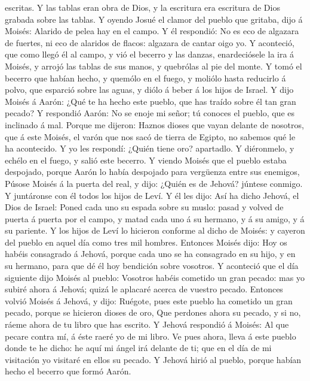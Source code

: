 escritas.  Y las tablas eran obra de Dios, y la escritura
era escritura de Dios grabada sobre las tablas.  Y oyendo
Josué el clamor del pueblo que gritaba, dijo á Moisés: Alarido de pelea
hay en el campo.  Y él respondió: No es eco de algazara
de fuertes, ni eco de alaridos de flacos: algazara de cantar oigo yo.
 Y aconteció, que como llegó él al campo, y vió el
becerro y las danzas, enardeciósele la ira á Moisés, y arrojó las tablas
de sus manos, y quebrólas al pie del monte.  Y tomó el
becerro que habían hecho, y quemólo en el fuego, y moliólo hasta
reducirlo á polvo, que esparció sobre las aguas, y diólo á beber á los
hijos de Israel.  Y dijo Moisés á Aarón: ¿Qué te ha hecho
este pueblo, que has traído sobre él tan gran pecado?  Y
respondió Aarón: No se enoje mi señor; tú conoces el pueblo, que es
inclinado á mal.  Porque me dijeron: Haznos dioses que
vayan delante de nosotros, que á este Moisés, el varón que nos sacó de
tierra de Egipto, no sabemos qué le ha acontecido.  Y yo
les respondí: ¿Quién tiene oro? apartadlo. Y diéronmelo, y echélo en el
fuego, y salió este becerro.  Y viendo Moisés que el
pueblo estaba despojado, porque Aarón lo había despojado para vergüenza
entre sus enemigos,  Púsose Moisés á la puerta del real,
y dijo: ¿Quién es de Jehová? júntese conmigo. Y juntáronse con él todos
los hijos de Leví.  Y él les dijo: Así ha dicho Jehová,
el Dios de Israel: Poned cada uno su espada sobre su muslo: pasad y
volved de puerta á puerta por el campo, y matad cada uno á su hermano, y
á su amigo, y á su pariente.  Y los hijos de Leví lo
hicieron conforme al dicho de Moisés: y cayeron del pueblo en aquel día
como tres mil hombres.  Entonces Moisés dijo: Hoy os
habéis consagrado á Jehová, porque cada uno se ha consagrado en su hijo,
y en su hermano, para que dé él hoy bendición sobre vosotros.
 Y aconteció que el día siguiente dijo Moisés al pueblo:
Vosotros habéis cometido un gran pecado: mas yo subiré ahora á Jehová;
quizá le aplacaré acerca de vuestro pecado.  Entonces
volvió Moisés á Jehová, y dijo: Ruégote, pues este pueblo ha cometido un
gran pecado, porque se hicieron dioses de oro,  Que
perdones ahora su pecado, y si no, ráeme ahora de tu libro que has
escrito.  Y Jehová respondió á Moisés: Al que pecare
contra mí, á éste raeré yo de mi libro.  Ve pues ahora,
lleva á este pueblo donde te he dicho: he aquí mi ángel irá delante de
ti; que en el día de mi visitación yo visitaré en ellos su pecado.
 Y Jehová hirió al pueblo, porque habían hecho el becerro
que formó Aarón.

